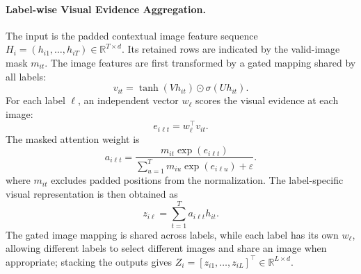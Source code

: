 \paragraph{Label-wise Visual Evidence Aggregation.}
The input is the padded contextual image feature sequence
$H_i=(h_{i1},\ldots,h_{iT})\in\mathbb{R}^{T\times d}$.  Its retained rows
are indicated by the valid-image mask $m_{it}$.  The image features are first
transformed by a gated mapping shared by all labels:
\begin{equation}
v_{it}=\tanh(Vh_{it})\odot\sigma(Uh_{it}).
\label{eq:lccf_gate_new}
\end{equation}
For each label $\ell$, an independent vector $w_\ell$ scores the visual
evidence at each image:
\begin{equation}
e_{i\ell t}=w_\ell^{\top}v_{it}.
\label{eq:lccf_visual_score_new}
\end{equation}
The masked attention weight is
\begin{equation}
a_{i\ell t}
=\frac{m_{it}\exp(e_{i\ell t})}
{\sum_{u=1}^{T}m_{iu}\exp(e_{i\ell u})+\varepsilon}.
\label{eq:lccf_attention_new}
\end{equation}
where $m_{it}$ excludes padded positions from the normalization.  The
label-specific visual representation is then obtained as
\begin{equation}
z_{i\ell}=\sum_{t=1}^{T}a_{i\ell t}h_{it}.
\label{eq:lccf_visual_aggregate_new}
\end{equation}
The gated image mapping is shared across labels, while each label has its own
$w_\ell$, allowing different labels to select different images and share an
image when appropriate; stacking the outputs gives
$Z_i=[z_{i1},\ldots,z_{iL}]^{\top}\in\mathbb{R}^{L\times d}$.


